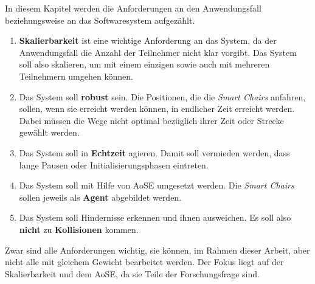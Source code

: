 In diesem Kapitel werden die Anforderungen an den Anwendungsfall beziehungsweise an das Softwaresystem aufgezählt.\newline
\begin{enumerate}
\item \textbf{Skalierbarkeit} ist eine wichtige Anforderung an das System, da der Anwendungsfall die Anzahl der Teilnehmer nicht klar vorgibt. Das System soll also skalieren, um mit einem einzigen sowie auch mit mehreren Teilnehmern umgehen können.
\item Das System soll \textbf{robust} sein. Die Positionen, die die \textit{Smart Chairs} anfahren, sollen, wenn sie erreicht werden können, in endlicher Zeit erreicht werden. Dabei müssen die Wege nicht optimal bezüglich ihrer Zeit oder Strecke gewählt werden.
\item Das System soll in \textbf{Echtzeit} agieren. Damit soll vermieden werden, dass lange Pausen oder Initialisierungsphasen eintreten.
\item Das System soll mit Hilfe von AoSE umgesetzt werden. Die \textit{Smart Chairs} sollen jeweils als \textbf{Agent} abgebildet werden.
\item Das System soll Hindernisse erkennen und ihnen ausweichen. Es soll also \textbf{nicht} zu \textbf{Kollisionen} kommen.
\end{enumerate}
Zwar sind alle Anforderungen wichtig, sie können, im Rahmen dieser Arbeit, aber nicht alle mit gleichem Gewicht bearbeitet werden. Der Fokus liegt auf der Skalierbarkeit und dem AoSE, da sie Teile der Forschungsfrage sind.